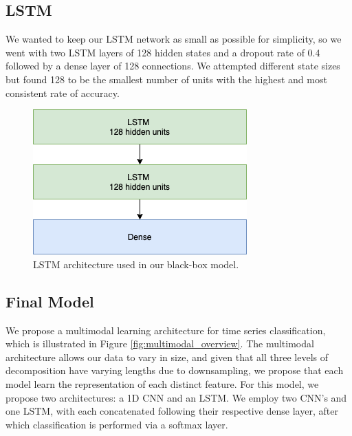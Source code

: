 \documentclass{turabian-thesis}
\begin{document}
\subsection{LSTM}
We wanted to keep our LSTM network as small as possible for simplicity, so we went with two LSTM layers of 128 hidden states and a dropout rate of 0.4  followed by a dense layer of 128 connections. We attempted different state sizes but found 128 to be the smallest number of units with the highest and most consistent rate of accuracy.

\begin{figure}[h!]
   \begin{center}
      \includegraphics[scale=0.6]{../media/lstm_model.png}
   \end{center}
   \caption{LSTM architecture used in our black-box model.}
   \label{fig:lstm_model}
\end{figure}


\subsection{Final Model}

We propose a multimodal learning architecture for time series classification, which is illustrated in Figure \ref{fig:multimodal_overview}. The multimodal architecture allows our data to vary in size, and given that all three levels of decomposition have varying lengths due to downsampling, we propose that each model learn the representation of each distinct feature. For this model, we propose two architectures: a 1D CNN and an LSTM. We employ two CNN’s and one LSTM, with each concatenated following their respective dense layer, after which classification is performed via a softmax layer. 
\end{document}
